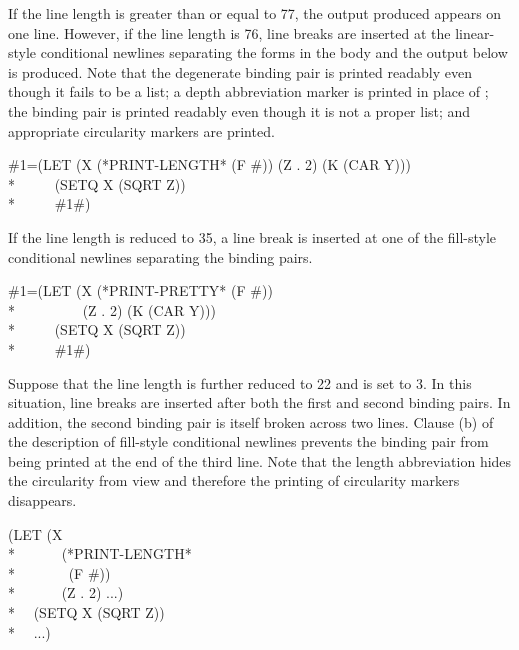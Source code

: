 If the line length is greater than or equal to 77, the output produced
appears on one line.  However, if the line length is 76, line breaks are
inserted at the linear-style conditional newlines separating the forms in
the body and the output below is produced.  Note that the degenerate
binding pair  is printed readably even though it fails to be a list; a
depth abbreviation marker is printed in place of ; the binding pair
 is printed readably even though it is not a proper list; and
appropriate circularity markers are printed.
\begin{lisp}
\#1=(LET (X (*PRINT-LENGTH* (F \#)) (Z . 2) (K (CAR Y)))  \\*
~~~~~(SETQ X (SQRT Z)) \\*
~~~~~\#1\#)
\end{lisp}

If the line length is reduced to 35, a line break is inserted at one of the
fill-style conditional newlines separating the binding pairs.
\begin{lisp}
\#1=(LET (X (*PRINT-PRETTY* (F \#)) \\*
~~~~~~~~~(Z . 2) (K (CAR Y))) \\*
~~~~~(SETQ X (SQRT Z)) \\*
~~~~~\#1\#)
\end{lisp}

Suppose that the line length is further reduced to 22 and  is
set to 3. In this situation, line breaks are inserted after both the first
and second binding pairs.  In addition, the second binding pair is itself
broken across two lines.  Clause (b) of the description of fill-style
conditional newlines prevents the binding pair  from being printed
at the end of the third line.  Note that the length abbreviation hides the
circularity from view and therefore the printing of circularity markers
disappears.
\begin{lisp}
(LET (X \\*
~~~~~~(*PRINT-LENGTH* \\*
~~~~~~~(F \#)) \\*
~~~~~~(Z . 2) ...) \\*
~~(SETQ X (SQRT Z)) \\*
~~...)
\end{lisp}

